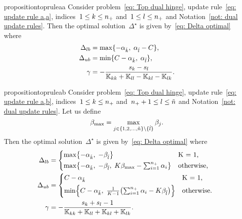 \begin{restatable}{proposition}{topruleaa}\label{prop: toppushk family hinge update a,a}
  Consider problem~\eqref{eq: Top dual hinge}, update rule~\eqref{eq: update rule a,a}, indices~$1 \leq k \leq n_{+}$ and~$1 \leq l \leq n_{+}$ and Notation~\ref{not: dual update rules}. Then the optimal solution~$\Delta^{\star}$ is given by~\eqref{eq: Delta optimal} where
  \begin{align*}
    \Delta_{lb} & = \max\{- \alpha_{\hat{k}},\; \alpha_{\hat{l}} - C\}, \\
    \Delta_{ub} & = \min\{C - \alpha_{\hat{k}},\; \alpha_{\hat{l}} \}, \\
    \gamma & = -\frac{s_k - s_l}{\mathbb{K}_{kk} + \mathbb{K}_{ll} - \mathbb{K}_{kl} - \mathbb{K}_{lk}}.
  \end{align*}
\end{restatable}

\begin{restatable}{proposition}{topruleab}\label{prop: toppushk family hinge update a,b}
  Consider problem~\eqref{eq: Top dual hinge}, update rule~\eqref{eq: update rule a,b}, indices~$1 \leq k \leq n_{+}$ and~$n_{+} + 1 \leq l \leq \tilde{n}$ and Notation~\ref{not: dual update rules}. Let us define
  \begin{equation*}
    \beta_{\max} = \max_{j \in \{1, 2, \ldots, \tilde{n} \} \setminus \{\hat{l}\}} \beta_j.
  \end{equation*}
  Then the optimal solution~$\Delta^{\star}$ is given by~\eqref{eq: Delta optimal} where
  \begin{align*}
    \Delta_{lb} & = 
      \begin{cases*}
        \max \Brac[c]{- \alphak, \;  -\betal} & K = 1, \\
        \max \Brac[c]{- \alphak, \;  -\betal, \; K\beta_{\max} - \sum_{i = 1}^{\npos} \alpha_i} & \textrm{otherwise},
      \end{cases*} \\
    \Delta_{ub} & = 
      \begin{cases*}
          C - \alphak & K = 1, \\
          \min \Brac[c]{C - \alphak, \; \frac{1}{K-1}\Brac{\sum_{i = 1}^{\npos} \alpha_i - K \betal}}  & \textrm{otherwise}.
      \end{cases*} \\
    \gamma & = - \frac{s_k + s_l - 1}{\K_{kk} + \K_{ll} + \K_{kl} + \K_{lk}}.
  \end{align*}
\end{restatable}

